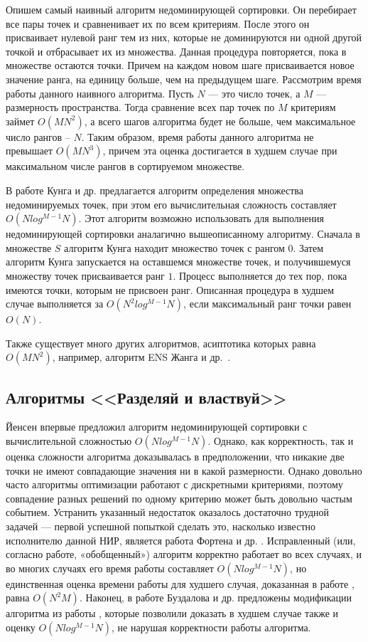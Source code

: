 Опишем самый наивный алгоритм недоминирующей сортировки. Он перебирает все пары точек и сравненивает их по всем критериям.
После этого он присваивает нулевой ранг тем из них, которые не доминируются ни одной  другой точкой и отбрасывает их из 
множества. Данная процедура повторяется, пока в множестве остаются точки. Причем на каждом новом шаге присваивается 
новое значение ранга, на единицу больше, чем на предыдущем шаге. Рассмотрим время работы данного наивного алгоритма.
Пусть $N$ — это число точек, а $M$ — размерность пространства. Тогда сравнение всех пар точек по $M$ критериям займет 
$O(MN^2)$, а всего шагов алгоритма будет не больше, чем максимальное число рангов -- $N$. Таким образом, время работы
данного алгоритма не превышает $O(MN^3)$, причем эта оценка достигается в худшем случае при максимальном числе рангов
в сортируемом множестве.

В работе Кунга и др. \cite{Kung} предлагается алгоритм определения множества недоминируемых точек, при этом его
вычислительная сложность составляет $O(N log^{M-1} N)$. Этот алгоритм возможно использовать для выполнения недоминирующей 
сортировки аналагично вышеописанному алгоритму. Сначала в множестве $S$ алгоритм Кунга находит множество точек с рангом $0$. 
Затем алгоритм Кунга запускается на оставшемся множестве точек, и получившемуся множеству точек присваивается ранг $1$. 
Процесс выполняется до тех пор, пока имеются точки, которым не присвоен ранг. Описанная процедура в худшем случае 
выполняется за $O(N^2 log^{M-1} N)$, если максимальный ранг точки равен $O(N)$.

Также существует много других алгоритмов, асиптотика которых равна $O(MN^2)$, например, алгоритм ENS Жанга и др.~\cite{Zhang}.

\subsection{Алгоритмы <<Разделяй и властвуй>>}

Йенсен \cite{Jensen} впервые предложил алгоритм недоминирующей сортировки с вычислительной сложностью
$O(N log^{M-1} N)$. Однако, как корректность, так и оценка сложности алгоритма доказывалась в предположении,
что никакие две точки не имеют совпадающие значения ни в какой размерности. Однако довольно часто алгоритмы оптимизации
работают с дискретными критериями, поэтому совпадение разных решений по одному критерию может быть довольно частым событием.
Устранить указанный недостаток оказалось достаточно трудной задачей — первой успешной попыткой сделать это, насколько 
известно исполнителю данной НИР, является работа Фортена и др. \cite{Forton}. Исправленный (или, согласно работе, 
«обобщенный») алгоритм корректно работает во всех случаях, и во многих случаях его время работы составляет $O(N log^{M-1} N)$, 
но единственная оценка времени работы для худшего случая, доказанная в работе \cite{Jensen}, равна $O(N^2M)$. Наконец, в работе 
Буздалова и др. \cite{Buzdalov} предложены модификации алгоритма из работы \cite{Jensen}, которые позволили доказать в худшем
случае также и оценку $O(N log^{M-1} N)$, не нарушая корректности работы алгоритма.

